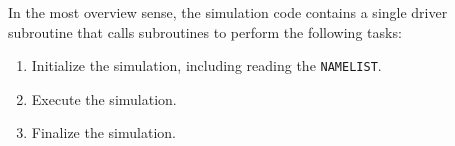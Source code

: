 In the most overview sense, the simulation code contains a single driver subroutine that calls subroutines to perform the following tasks:
\begin{enumerate}[1.]
	\item Initialize the simulation, including reading the \texttt{NAMELIST}.
	\item Execute the simulation.
	\item Finalize the simulation.
\end{enumerate}

